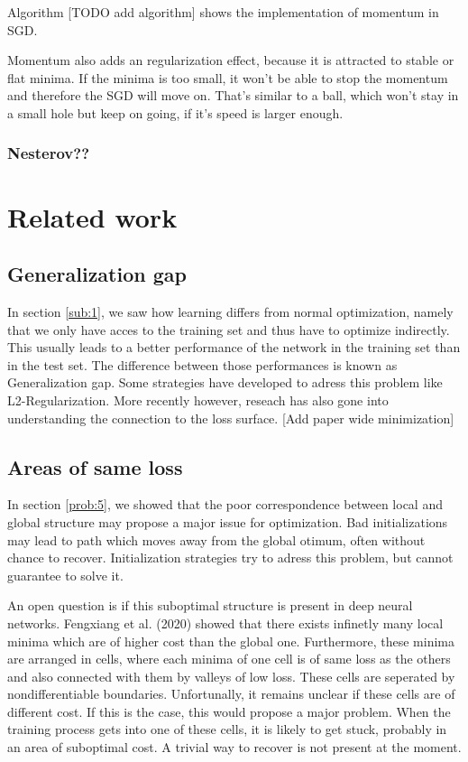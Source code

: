 Algorithm [TODO add algorithm] shows the implementation of momentum in SGD.

Momentum also adds an regularization effect, because it is attracted to stable
or flat minima. If the minima is too small, it won't be able to stop the
momentum and therefore the SGD will move on. That's similar to a ball, which
won't stay in a small hole but keep on going, if it's speed is larger enough.



\subsubsection{Nesterov??}


\section{Related work}
\subsection{Generalization gap}
In section \ref{sub:1}, we saw how learning differs from normal optimization,
namely that we only have acces to the training set and thus have to optimize
indirectly. This usually leads to a better performance of the network in the
training set than in the test set. The difference between those performances is
known as Generalization gap. Some strategies have developed to adress this
problem like L2-Regularization. More recently however, reseach has also gone
into understanding the connection to the loss surface. 
[Add paper wide minimization]

\subsection{Areas of same loss}\label{loss_landscape}
In section \ref{prob:5}, we showed that the poor correspondence between local
and global structure may propose a major issue for optimization. Bad
initializations may lead to path which moves away from the global otimum, often
without chance to recover. Initialization strategies try to adress this problem,
but cannot guarantee to solve it.

An open question is if this suboptimal structure is present in deep neural
networks. Fengxiang et al. (2020) showed that there exists infinetly many local
minima which are of higher cost than the global one. Furthermore, these minima
are arranged in cells, where each minima of one cell is of same loss as the
others and also connected with them by valleys of low loss. These cells are
seperated by nondifferentiable boundaries. Unfortunally, it remains unclear if
these cells are of different cost. If this is the case, this would propose a
major problem. When the training process gets into one of these cells, it is
likely to get stuck, probably in an area of suboptimal cost. A trivial way to
recover is not present at the moment.

